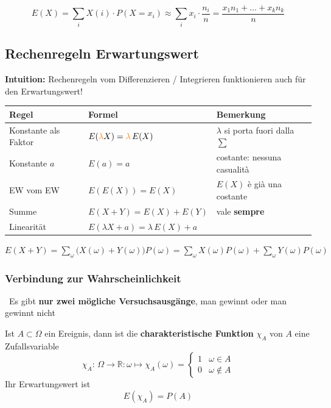 \vspace{0.2cm}

$$ \boxed{ E(X) = \sum\limits_i X(i) \cdot P(X = x_i) \approx \sum\limits_i x_i \cdot \frac{n_i}{n} = \frac{x_1 n_1 + ... + x_k n_k}{n} } $$


\subsection{Rechenregeln Erwartungswert}

\textbf{Intuition:} Rechenregeln vom Differenzieren / Integrieren funktionieren auch für den Erwartungswert!


\renewcommand{\arraystretch}{1.6}
\begin{tabular}{@{}l l l@{}}
	\textbf{Regel}				& \textbf{Formel}							& \textbf{Bemerkung} \\ \hline
	Konstante als Faktor		& $E({\color{orange}\lambda} X) = {\color{orange}\lambda} \, E(X)$	& $\lambda$ si porta fuori dalla $\sum$ \\
	Konstante $a$				& $E(a) = a$									& costante: nessuna casualità \\
	EW vom EW					& $E(E(X)) = E(X)$							& $E(X)$ è già una costante \\
	Summe						& $E(X + Y) = E(X) + E(Y)$					& vale \textbf{sempre} \\
	Linearität					& $E(\lambda X + a) = \lambda \, E(X) + a$	& \\
\end{tabular}
\renewcommand{\arraystretch}{1}

\smallskip
{\small {} \;
$E(X + Y) = \sum\limits_{\omega} \big( X(\omega) + Y(\omega) \big) P(\omega) = \sum\limits_{\omega} X(\omega) P(\omega) + \sum\limits_{\omega} Y(\omega) P(\omega)$}

\subsubsection{Verbindung zur Wahrscheinlichkeit}

\textrightarrow\ Es gibt \textbf{nur zwei mögliche Versuchsausgänge}, man gewinnt oder man gewinnt nicht

\vspace{0.2cm}

Ist $ A \subset \Omega$ ein Ereignis, dann ist die \textbf{charakteristische Funktion} $\chi_A$ von $A$ eine Zufallsvariable 
$$ \chi_A: \, \Omega \rightarrow \mathbb{R}: \omega \mapsto \chi_A(\omega) =
\begin{cases} 1 & \omega \in A \\ 0 & \omega \notin A \end{cases} $$
Ihr Erwartungswert ist 
$$ \boxed{ E(\chi_A)= P(A) } $$

